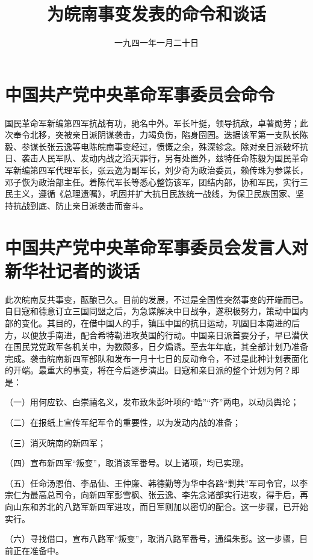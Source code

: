 
\title{为皖南事变发表的命令和谈话}
\date{一九四一年一月二十日}
\maketitle


\section{中国共产党中央革命军事委员会命令}

国民革命军新编第四军抗战有功，驰名中外。军长叶挺，领导抗敌，卓著勋劳；此次奉令北移，突被亲日派阴谋袭击，力竭负伤，陷身囹圄。迭据该军第一支队长陈毅、参谋长张云逸等电陈皖南事变经过，愤慨之余，殊深轸念。除对亲日派破坏抗日、袭击人民军队、发动内战之滔天罪行，另有处置外，兹特任命陈毅为国民革命军新编第四军代理军长，张云逸为副军长，刘少奇为政治委员，赖传珠为参谋长，邓子恢为政治部主任。着陈代军长等悉心整饬该军，团结内部，协和军民，实行三民主义，遵循《总理遗嘱》，巩固并扩大抗日民族统一战线，为保卫民族国家、坚持抗战到底、防止亲日派袭击而奋斗。

\section{中国共产党中央革命军事委员会发言人对新华社记者的谈话}

此次皖南反共事变，酝酿已久。目前的发展，不过是全国性突然事变的开端而已。自日寇和德意订立三国同盟之后，为急谋解决中日战争，遂积极努力，策动中国内部的变化。其目的，在借中国人的手，镇压中国的抗日运动，巩固日本南进的后方，以便放手南进，配合希特勒进攻英国的行动。中国亲日派首要分子，早已潜伏在国民党党政军各机关中，为数颇多，日夕煽诱。至去年年底，其全部计划乃准备完成。袭击皖南新四军部队和发布一月十七日的反动命令，不过是此种计划表面化的开端。最重大的事变，将在今后逐步演出。日寇和亲日派的整个计划为何？即是：

（一）用何应钦、白崇禧名义，发布致朱彭叶项的“皓”“齐”两电，以动员舆论；

（二）在报纸上宣传军纪军令的重要性，以为发动内战的准备；

（三）消灭皖南的新四军；

（四）宣布新四军“叛变”，取消该军番号。以上诸项，均已实现。

（五）任命汤恩伯、李品仙、王仲廉、韩德勤等为华中各路“剿共”军司令官，以李宗仁为最高总司令，向新四军彭雪枫、张云逸、李先念诸部实行进攻，得手后，再向山东和苏北的八路军新四军进攻，而日军则加以密切的配合。这一步骤，已开始实行。

（六）寻找借口，宣布八路军“叛变”，取消八路军番号，通缉朱彭。这一步骤，目前正在准备中。

